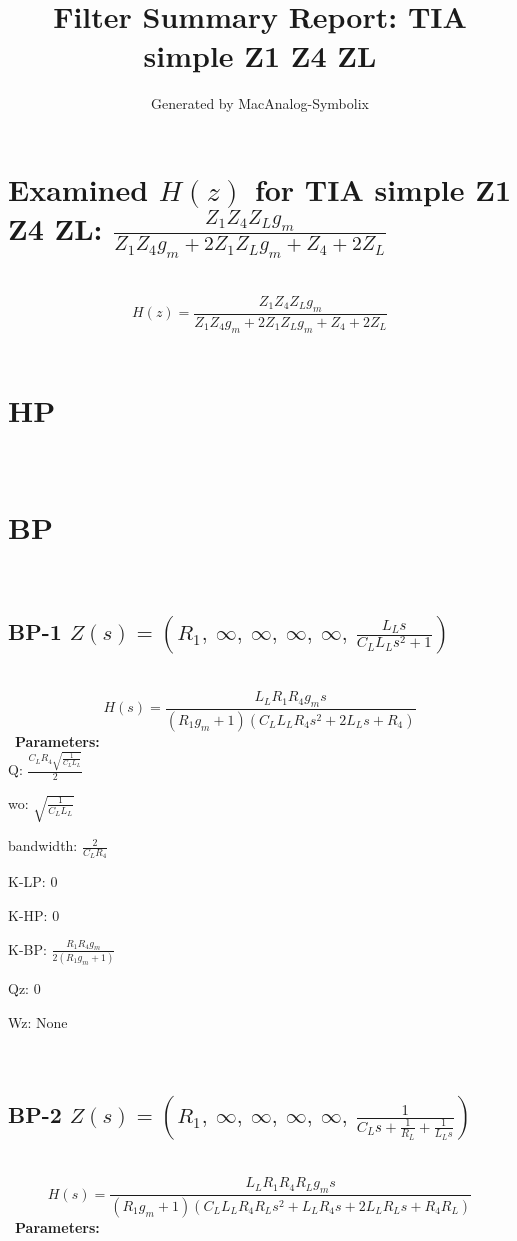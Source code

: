 \documentclass{article}
\begin{document}
        
                        \title{Filter Summary Report: TIA simple Z1 Z4 ZL}
                        \author{Generated by MacAnalog-Symbolix}
                        \maketitle

                        \tableofcontents
                        \newpage
                        \section{Examined $H(z)$ for TIA simple Z1 Z4 ZL: $\frac{Z_{1} Z_{4} Z_{L} g_{m}}{Z_{1} Z_{4} g_{m} + 2 Z_{1} Z_{L} g_{m} + Z_{4} + 2 Z_{L}}$ }\ 
\textbf{\[H(z) = \frac{Z_{1} Z_{4} Z_{L} g_{m}}{Z_{1} Z_{4} g_{m} + 2 Z_{1} Z_{L} g_{m} + Z_{4} + 2 Z_{L}}\] }\ 
\section{HP}\ 
\section{BP}\ 
\subsection{BP-1 $Z(s) = \left( R_{1}, \  \infty, \  \infty, \  \infty, \  \infty, \  \frac{L_{L} s}{C_{L} L_{L} s^{2} + 1}\right)$ } \ 
\textbf{\[H(s) = \frac{L_{L} R_{1} R_{4} g_{m} s}{\left(R_{1} g_{m} + 1\right) \left(C_{L} L_{L} R_{4} s^{2} + 2 L_{L} s + R_{4}\right)}\] } \ 
\textbf{Parameters:}\\ 

Q: $\frac{C_{L} R_{4} \sqrt{\frac{1}{C_{L} L_{L}}}}{2}$\ 

wo: $\sqrt{\frac{1}{C_{L} L_{L}}}$\ 

bandwidth: $\frac{2}{C_{L} R_{4}}$\ 

K-LP: $0$\ 

K-HP: $0$\ 

K-BP: $\frac{R_{1} R_{4} g_{m}}{2 \left(R_{1} g_{m} + 1\right)}$\ 

Qz: $0$\ 

Wz: $\text{None}$\ 

\ 

\subsection{BP-2 $Z(s) = \left( R_{1}, \  \infty, \  \infty, \  \infty, \  \infty, \  \frac{1}{C_{L} s + \frac{1}{R_{L}} + \frac{1}{L_{L} s}}\right)$ } \ 
\textbf{\[H(s) = \frac{L_{L} R_{1} R_{4} R_{L} g_{m} s}{\left(R_{1} g_{m} + 1\right) \left(C_{L} L_{L} R_{4} R_{L} s^{2} + L_{L} R_{4} s + 2 L_{L} R_{L} s + R_{4} R_{L}\right)}\] } \ 
\textbf{Parameters:}\\ 
\end{document}
